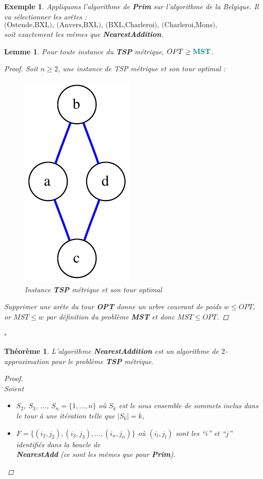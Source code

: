 \documentclass{article}
\newcommand{\titre}[1]{\textcolor{title}{#1}}
\newcommand{\cqfd}{\begin{flushright}$\square$\end{flushright}}
\newtheorem{exemple}{Exemple}[section]
\newtheorem{thm}{Th\'eor\`eme}[section]
\newtheorem{lemme}{Lemme}[section]
\newtheorem{proof}{Preuve}[section]
\begin{document}
\begin{sffamily}
\begin{exemple}
Appliquons l'algorithme de \textbf{Prim} sur l'algorithme de la Belgique.
Il va sélectionner les arêtes : 
$$\text{(Ostende,BXL), (Anvers,BXL), (BXL,Charleroi), (Charleroi,Mons), (Charleroi,Liège), (Liège,Arlon)}$$
soit exactement les mêmes que \textbf{NearestAddition}.
\end{exemple}

\begin{lemme}\label{optgeqmst}
Pour toute instance du \textbf{\titre{TSP}} métrique, $OPT \geq \titre{\mathbf{MST}}$.
\begin{proof}
Soit $n\geq 2$, une instance de TSP métrique et son tour optimal :
\begin{figure}[h!]
    \begin{center}
    \includegraphics[scale=0.42]{optTSP.pdf}
    \caption{Instance \textbf{\titre{TSP}} métrique et son tour optimal}
    \end{center}	
\end{figure}
Supprimer une arête du tour \textbf{OPT} donne un arbre couvrant de poids $w\leq OPT$, or $MST\leq w$ par définition du problème 
\textbf{\titre{MST}} et donc $MST\leq OPT$.
\end{proof}
\cqfd
\end{lemme}

\begin{thm}
L'algorithme \textbf{NearestAddition} est un algorithme de $2$-approximation pour le problème \textbf{\titre{TSP}} métrique.
\begin{proof}$ $\\
Soient 
\begin{itemize}
\item $S_2$, $S_3$, $\ldots$, $S_n=\{1,\ldots,n\}$ où $S_k$ est le sous ensemble de sommets inclus dans le tour à une itération telle que 
$|S_k|=k$,
\item $F = \{ (i_2,j_2), (i_3,j_3), \ldots, (i_n,j_n)\}$ où $(i_l,j_l)$ sont les ``$i$'' et ``$j$'' identifiés dans la boucle de \\
\textbf{NearestAdd} \textit{(ce sont les mêmes que pour \textbf{Prim})}. \\
\end{itemize}


\end{proof}
\end{thm}
\end{sffamily}
\end{document}
